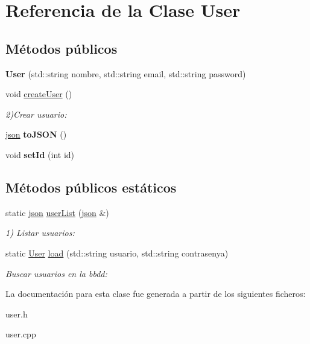 \hypertarget{classUser}{}\section{Referencia de la Clase User}
\label{classUser}
\subsection*{Métodos públicos}
\begin{DoxyCompactItemize}
\item 
\mbox{\label{classUser_ac04e4a77a3ebe1b48113d8bbf6018588}} 
{\bfseries User} (std\+::string nombre, std\+::string email, std\+::string password)
\item 
\mbox{\label{classUser_af03fae68c61e5b1733235d03d0b86484}} 
void \mbox{\hyperlink{classUser_af03fae68c61e5b1733235d03d0b86484}{create\+User}} ()
\begin{DoxyCompactList}\small\item\em 2)Crear usuario\+: \end{DoxyCompactList}\item 
\mbox{\label{classUser_a586ba756b0b7bb8fa81de00c3a82660c}} 
\mbox{\hyperlink{classnlohmann_1_1basic__json}{json}} {\bfseries to\+J\+S\+ON} ()
\item 
\mbox{\label{classUser_a792a213160c4fccf098fa6a8d8d8f01e}} 
void {\bfseries set\+Id} (int id)
\end{DoxyCompactItemize}
\subsection*{Métodos públicos estáticos}
\begin{DoxyCompactItemize}
\item 
\mbox{\label{classUser_a9d6744d7469b81e70da6449519d8b7fc}} 
static \mbox{\hyperlink{classnlohmann_1_1basic__json}{json}} \mbox{\hyperlink{classUser_a9d6744d7469b81e70da6449519d8b7fc}{user\+List}} (\mbox{\hyperlink{classnlohmann_1_1basic__json}{json}} \&)
\begin{DoxyCompactList}\small\item\em 1) Listar usuarios\+: \end{DoxyCompactList}\item 
\mbox{\label{classUser_af9d00689cf1d0e58a86d94332817a406}} 
static \mbox{\hyperlink{classUser}{User}} \mbox{\hyperlink{classUser_af9d00689cf1d0e58a86d94332817a406}{load}} (std\+::string usuario, std\+::string contrasenya)
\begin{DoxyCompactList}\small\item\em Buscar usuarios en la bbdd\+: \end{DoxyCompactList}\end{DoxyCompactItemize}


La documentación para esta clase fue generada a partir de los siguientes ficheros\+:\begin{DoxyCompactItemize}
\item 
user.\+h\item 
user.\+cpp\end{DoxyCompactItemize}
